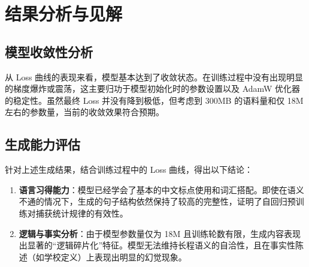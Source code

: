 \documentclass[a4paper,12pt]{ctexart} %
\begin{document}
\section{结果分析与见解}

\subsection{模型收敛性分析}
从 Loss 曲线的表现来看，模型基本达到了收敛状态。在训练过程中没有出现明显的梯度爆炸或震荡，这主要归功于模型初始化时的参数设置以及 AdamW 优化器的稳定性。虽然最终 Loss 并没有降到极低，但考虑到 300MB 的语料量和仅 18M 左右的参数量，当前的收敛效果符合预期。

\subsection{生成能力评估}
针对上述生成结果，结合训练过程中的 Loss 曲线，得出以下结论：
\begin{enumerate}
    \item \textbf{语言习得能力}：模型已经学会了基本的中文标点使用和词汇搭配。即使在语义不通的情况下，生成的句子结构依然保持了较高的完整性，证明了自回归预训练对捕获统计规律的有效性。
    \item \textbf{逻辑与事实分析}：由于模型参数量仅为 18M 且训练轮数有限，生成内容表现出显著的“逻辑碎片化”特征。模型无法维持长程语义的自洽性，且在事实性陈述（如学校定义）上表现出明显的幻觉现象。

\end{enumerate}
\end{document}
